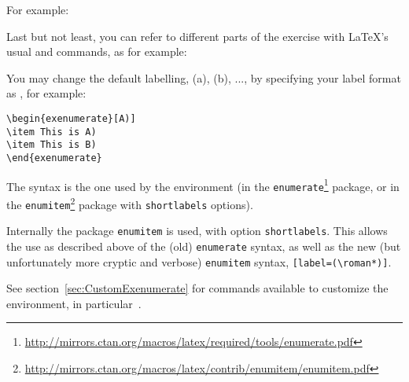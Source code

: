 \documentclass[11pt,a4paper]{article}
\begin{document}
For example:
\begin{pkgverbatim}
%
\end{pkgverbatim}

Last but not least, you can refer to different parts of the exercise with \LaTeX's usual
 and 
commands, as for example:
\begin{pkgverbatim}
%
\end{pkgverbatim}

You may change the default labelling, (a), (b), ..., by specifying your label format as
, for example:
\begin{pkgverbatim}
\begin{verbatim}
\begin{exenumerate}[A)]
\item This is A)
\item This is B)
\end{exenumerate}
\end{verbatim}
\end{pkgverbatim}
The syntax is the one used by the  environment (in the
\texttt{enumerate}\footnote{\url{http://mirrors.ctan.org/macros/latex/required/tools/enumerate.pdf}}
package, or in the
\texttt{enumitem}\footnote{\url{http://mirrors.ctan.org/macros/latex/contrib/enumitem/enumitem.pdf}}
package with \texttt{shortlabels} options).

\begin{pkgtip}
  Internally the package \texttt{enumitem} is used, with option \texttt{shortlabels}. This
  allows the use as described above of the (old) \texttt{enumerate} syntax, as well as the
  new (but unfortunately more cryptic and verbose) \texttt{enumitem} syntax,
  \texttt{[label=(\textbackslash roman*)]}.

  See section~\ref{sec:CustomExenumerate} for commands available to customize the
   environment, in particular~.
\end{pkgtip}
\end{document}
